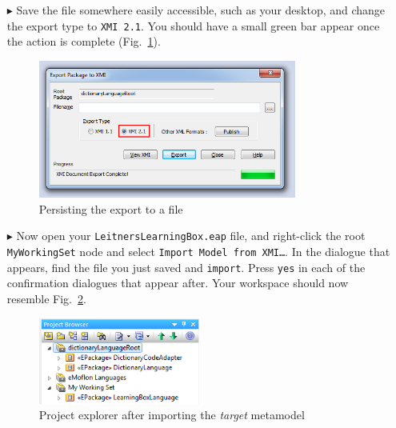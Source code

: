 \begin{itemize}
\item[$\blacktriangleright$] Save the file somewhere easily accessible, such as your desktop, and change the export type to \texttt{XMI 2.1}. You should have a
small green bar appear once the action is complete (Fig.~\ref{fig:exportDialogue}).

\vspace{0.5cm}

\begin{figure}[htbp]
\begin{center}
  \includegraphics[width=0.8\textwidth]{ea_exportPackageDialogue}
  \caption{Persisting the export to a file}
  \label{fig:exportDialogue}
\end{center}
\end{figure}

\item[$\blacktriangleright$] Now open your \texttt{LeitnersLearningBox.eap} file, and right-click the root \texttt{MyWorkingSet} node and select \texttt{Import
Model from XMI\ldots}. In the dialogue that appears, find the file you just saved and \texttt{import}. Press \texttt{yes} in each of the confirmation dialogues
that appear after. Your workspace should now resemble Fig.~\ref{fig:postImport}.

\vspace{0.5cm}

\begin{figure}[htbp]
\begin{center}
  \includegraphics[width=0.5\textwidth]{ea_postImport}
  \caption{Project explorer after importing the \emph{target} metamodel}
  \label{fig:postImport}
\end{center}
\end{figure}

\end{itemize}
